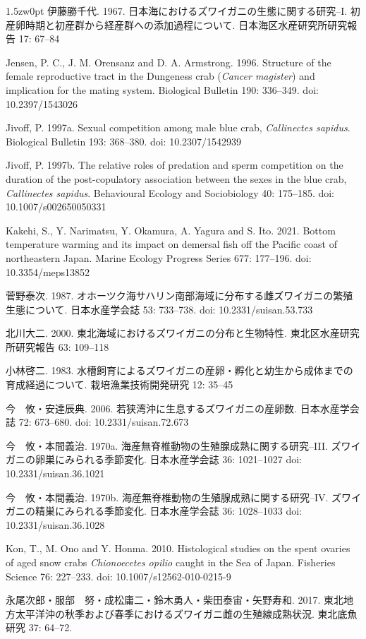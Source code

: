 \begin{indentation}{1.5zw}{0pt}
伊藤勝千代. 1967. 日本海におけるズワイガニの生態に関する研究--I. 初産卵時期と初産群から経産群への添加過程について. 日本海区水産研究所研究報告 17: 67--84

Jensen, P. C., J. M. Orensanz and D. A. Armstrong. 1996. Structure of the female reproductive tract in the Dungeness crab (\textit{Cancer magister}) and implication for the mating system. Biological Bulletin 190: 336--349. doi: 10.2397/1543026  

Jivoff, P. 1997a. Sexual competition among male blue crab, \textit{Callinectes sapidus}. Biological Bulletin 193: 368--380. doi: 10.2307/1542939

Jivoff, P. 1997b. The relative roles of predation and sperm competition on the duration of the post-copulatory association between the sexes in the blue crab, \textit{Callinectes sapidus}. Behavioural Ecology and Sociobiology 40: 175--185. doi: 10.1007/s002650050331

Kakehi, S., Y. Narimatsu, Y. Okamura, A. Yagura and S. Ito. 2021. Bottom temperature warming and its impact on demersal fish off the Pacific coast of northeastern Japan. Marine Ecology Progress Series 677: 177--196. doi: 10.3354/meps13852

菅野泰次. 1987. オホーツク海サハリン南部海域に分布する雌ズワイガニの繁殖生態について. 日本水産学会誌 53: 733--738. doi: 10.2331/suisan.53.733

北川大二. 2000. 東北海域におけるズワイガニの分布と生物特性. 東北区水産研究所研究報告 63: 109--118

小林啓二. 1983. 水槽飼育によるズワイガニの産卵・孵化と幼生から成体までの育成経過について. 栽培漁業技術開発研究 12: 35--45

今　攸・安達辰典. 2006. 若狭湾沖に生息するズワイガニの産卵数. 日本水産学会誌 72: 673--680. doi: 10.2331/suisan.72.673

今　攸・本間義治. 1970a. 海産無脊椎動物の生殖腺成熟に関する研究--III. ズワイガニの卵巣にみられる季節変化. 日本水産学会誌 36: 1021--1027 doi: 10.2331/suisan.36.1021

今　攸・本間義治. 1970b. 海産無脊椎動物の生殖腺成熟に関する研究--IV. ズワイガニの精巣にみられる季節変化. 日本水産学会誌 36: 1028--1033 doi: 10.2331/suisan.36.1028

Kon, T., M. Ono and Y. Honma. 2010. Histological studies on the spent ovaries of aged snow crabs \textit{Chionoecetes opilio} caught in the Sea of Japan. Fisheries Science 76: 227--233. doi: 10.1007/s12562-010-0215-9

永尾次郎・服部　努・成松庸二・鈴木勇人・柴田泰宙・矢野寿和. 2017. 東北地方太平洋沖の秋季および春季におけるズワイガニ雌の生殖線成熟状況. 東北底魚研究 37: 64--72.


\end{indentation}
